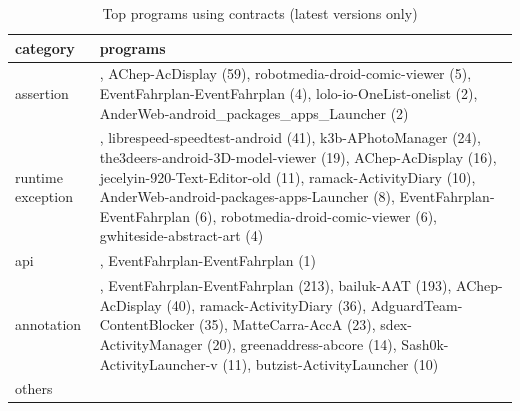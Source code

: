 \begin{table}[]
\centering
\caption{Top programs using contracts (latest versions only)}
\label{tab:topusers}
\begin{tabular}{|p{2.0cm}|p{6.0cm}|} \hline
   category & programs \\ \hline
assertion & , AChep-AcDisplay (59), robotmedia-droid-comic-viewer (5), EventFahrplan-EventFahrplan (4), lolo-io-OneList-onelist (2), AnderWeb-android_packages_apps_Launcher (2) \\ 
runtime exception & , librespeed-speedtest-android (41), k3b-APhotoManager (24), the3deers-android-3D-model-viewer (19), AChep-AcDisplay (16), jecelyin-920-Text-Editor-old (11), ramack-ActivityDiary (10), AnderWeb-android-packages-apps-Launcher (8), EventFahrplan-EventFahrplan (6), robotmedia-droid-comic-viewer (6), gwhiteside-abstract-art (4) \\ 
api & , EventFahrplan-EventFahrplan (1) \\ 
annotation & , EventFahrplan-EventFahrplan (213), bailuk-AAT (193), AChep-AcDisplay (40), ramack-ActivityDiary (36), AdguardTeam-ContentBlocker (35), MatteCarra-AccA (23), sdex-ActivityManager (20), greenaddress-abcore (14), Sash0k-ActivityLauncher-v (11), butzist-ActivityLauncher (10) \\ 
others &  \\ 
\hline
\end{tabular}
\end{table}
